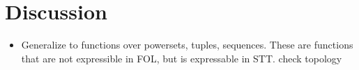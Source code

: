 \chapter{Discussion}
\label{ch:discussion}

\begin{itemize}
    \item Generalize to functions over powersets, tuples, sequences. These are functions that are not expressible in FOL, but is expressable in STT. check topology 
\end{itemize}